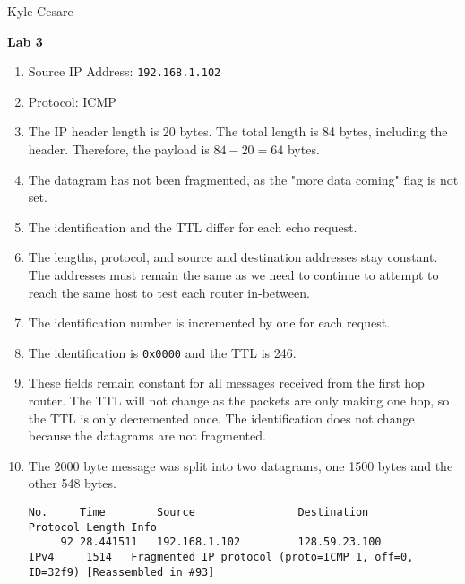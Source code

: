 \documentclass[11pt]{article}
\begin{document}
\begin{flushright}
  Kyle Cesare
\end{flushright}

{\center \textbf{Lab 3} \\}

\begin{enumerate}
  \item Source IP Address: \texttt{192.168.1.102}

  \item Protocol: ICMP

  \item The IP header length is 20 bytes.  The total length is 84 bytes,
        including the header.  Therefore, the payload is $84 - 20 = 64$ bytes.

  \item The datagram has not been fragmented, as the "more data coming" flag is
        not set.

  \item The identification and the TTL differ for each echo request.

  \item The lengths, protocol, and source and destination addresses stay
        constant.  The addresses must remain the same as we need to continue to
        attempt to reach the same host to test each router in-between.

  \item The identification number is incremented by one for each request.

  \item The identification is \texttt{0x0000} and the TTL is 246.

  \item These fields remain constant for all messages received from the first
        hop router.  The TTL will not change as the packets are only making one
        hop, so the TTL is only decremented once.  The identification does not
        change because the datagrams are not fragmented.

  \item The 2000 byte message was split into two datagrams, one 1500 bytes and
        the other 548 bytes.

{\tiny
\begin{verbatim}
No.     Time        Source                Destination           Protocol Length Info
     92 28.441511   192.168.1.102         128.59.23.100         IPv4     1514   Fragmented IP protocol (proto=ICMP 1, off=0, ID=32f9) [Reassembled in #93]


\end{verbatim}}
\end{enumerate}
\end{document}
